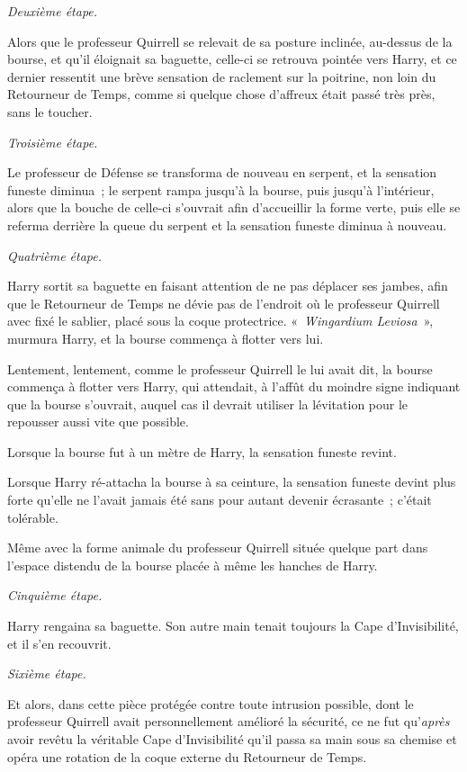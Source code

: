 \emph{Deuxième étape.}

Alors que le professeur Quirrell se relevait de sa posture inclinée, au-dessus de la bourse, et qu'il éloignait sa baguette, celle-ci se retrouva pointée vers Harry, et ce dernier ressentit une brève sensation de raclement sur la poitrine, non loin du Retourneur de Temps, comme si quelque chose d'affreux était passé très près, sans le toucher.

\emph{Troisième étape.}

Le professeur de Défense se transforma de nouveau en serpent, et la sensation funeste diminua~; le serpent rampa jusqu'à la bourse, puis jusqu'à l'intérieur, alors que la bouche de celle-ci s'ouvrait afin d'accueillir la forme verte, puis elle se referma derrière la queue du serpent et la sensation funeste diminua à nouveau.

\emph{Quatrième étape.}

Harry sortit sa baguette en faisant attention de ne pas déplacer ses jambes, afin que le Retourneur de Temps ne dévie pas de l'endroit où le professeur Quirrell avec fixé le sablier, placé sous la coque protectrice. «~\emph{Wingardium Leviosa}~», murmura Harry, et la bourse commença à flotter vers lui.

Lentement, lentement, comme le professeur Quirrell le lui avait dit, la bourse commença à flotter vers Harry, qui attendait, à l'affût du moindre signe indiquant que la bourse s'ouvrait, auquel cas il devrait utiliser la lévitation pour le repousser aussi vite que possible.

Lorsque la bourse fut à un mètre de Harry, la sensation funeste revint.

Lorsque Harry ré-attacha la bourse à sa ceinture, la sensation funeste devint plus forte qu'elle ne l'avait jamais été sans pour autant devenir écrasante~; c'était tolérable.

Même avec la forme animale du professeur Quirrell située quelque part dans l'espace distendu de la bourse placée à même les hanches de Harry.

\emph{Cinquième étape.}

Harry rengaina sa baguette. Son autre main tenait toujours la Cape d'Invisibilité, et il s'en recouvrit.

\emph{Sixième étape.}

Et alors, dans cette pièce protégée contre toute intrusion possible, dont le professeur Quirrell avait personnellement amélioré la sécurité, ce ne fut qu'\emph{après} avoir revêtu la véritable Cape d'Invisibilité qu'il passa sa main sous sa chemise et opéra une rotation de la coque externe du Retourneur de Temps.

